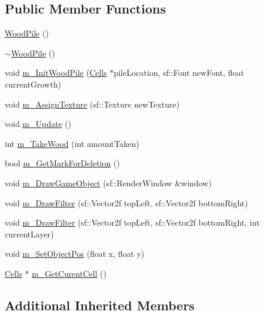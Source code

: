 \subsection*{Public Member Functions}
\begin{DoxyCompactItemize}
\item 
\mbox{\hyperlink{class_wood_pile_a9572061fc6db784b5acc68cde0c95435}{Wood\+Pile}} ()
\item 
\mbox{\hyperlink{class_wood_pile_a7bce94d6dd074921d7905d300f5cb82a}{$\sim$\+Wood\+Pile}} ()
\item 
void \mbox{\hyperlink{class_wood_pile_a19156e17630117c4e031ccd594101d1a}{m\+\_\+\+Init\+Wood\+Pile}} (\mbox{\hyperlink{class_cells}{Cells}} $\ast$pile\+Location, sf\+::\+Font new\+Font, float current\+Growth)
\item 
void \mbox{\hyperlink{class_wood_pile_a32821c728e54c6c77c922e3c5a4d1cb8}{m\+\_\+\+Assign\+Texture}} (sf\+::\+Texture new\+Texture)
\item 
void \mbox{\hyperlink{class_wood_pile_a008e8dc7b168ab4e0bcc946c240d0a32}{m\+\_\+\+Update}} ()
\item 
int \mbox{\hyperlink{class_wood_pile_ae034c119180b63f716472739b80f9f63}{m\+\_\+\+Take\+Wood}} (int amount\+Taken)
\item 
bool \mbox{\hyperlink{class_wood_pile_aa0e4d61a9d9b42b4ec4b0f129f6b60d6}{m\+\_\+\+Get\+Mark\+For\+Deletion}} ()
\item 
void \mbox{\hyperlink{class_wood_pile_aacdd6153eacdeaf06cddf83cca50da03}{m\+\_\+\+Draw\+Game\+Object}} (sf\+::\+Render\+Window \&window)
\item 
void \mbox{\hyperlink{class_wood_pile_a4434a4c1251a6719b76825a7546ca04c}{m\+\_\+\+Draw\+Filter}} (sf\+::\+Vector2f top\+Left, sf\+::\+Vector2f bottom\+Right)
\item 
void \mbox{\hyperlink{class_wood_pile_a813fd022f48917ee10b81c94810d27ad}{m\+\_\+\+Draw\+Filter}} (sf\+::\+Vector2f top\+Left, sf\+::\+Vector2f bottom\+Right, int current\+Layer)
\item 
void \mbox{\hyperlink{class_wood_pile_a8faa580584607dea772076b7d856daf8}{m\+\_\+\+Set\+Object\+Pos}} (float x, float y)
\item 
\mbox{\hyperlink{class_cells}{Cells}} $\ast$ \mbox{\hyperlink{class_wood_pile_ac5f5d04824b12b5e31ffe1d4ba92dbf5}{m\+\_\+\+Get\+Curent\+Cell}} ()
\end{DoxyCompactItemize}
\subsection*{Additional Inherited Members}


